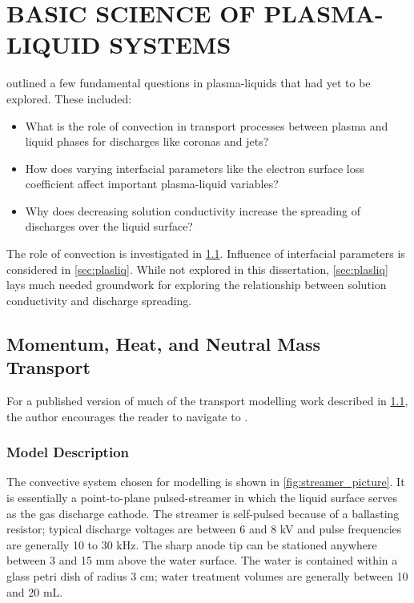 \chapter{BASIC SCIENCE OF PLASMA-LIQUID SYSTEMS}
\label{chap:basic_science}

 outlined a few fundamental questions in plasma-liquids that had yet to be explored. These included:

\begin{itemize}
\item What is the role of convection in transport processes between plasma and liquid phases for discharges like coronas and jets?
\item How does varying interfacial parameters like the electron surface loss coefficient affect important plasma-liquid variables?
\item Why does decreasing solution conductivity increase the spreading of discharges over the liquid surface?
\end{itemize}

The role of convection is investigated in \cref{sec:plasfree_model}. Influence of interfacial parameters is considered in \cref{sec:plasliq}. While not explored in this dissertation, \cref{sec:plasliq} lays much needed groundwork for exploring the relationship between solution conductivity and discharge spreading.

\section{Momentum, Heat, and Neutral Mass Transport}
\label{sec:plasfree_model}

For a published version of much of the transport modelling work described in \cref{sec:plasfree_model}, the author encourages the reader to navigate to \cite{lindsay2015momentum}.

\subsection{Model Description}

The convective system chosen for modelling is shown in \cref{fig:streamer_picture}. It is essentially a point-to-plane pulsed-streamer in which the liquid surface serves as the gas discharge cathode. The streamer is self-pulsed because of a ballasting resistor; typical discharge voltages are between 6 and 8 kV and pulse frequencies are generally 10 to 30 kHz. The sharp anode tip can be stationed anywhere between 3 and 15 mm above the water surface. The water is contained within a glass petri dish of radius 3 cm; water treatment volumes are generally between 10 and 20 mL.

